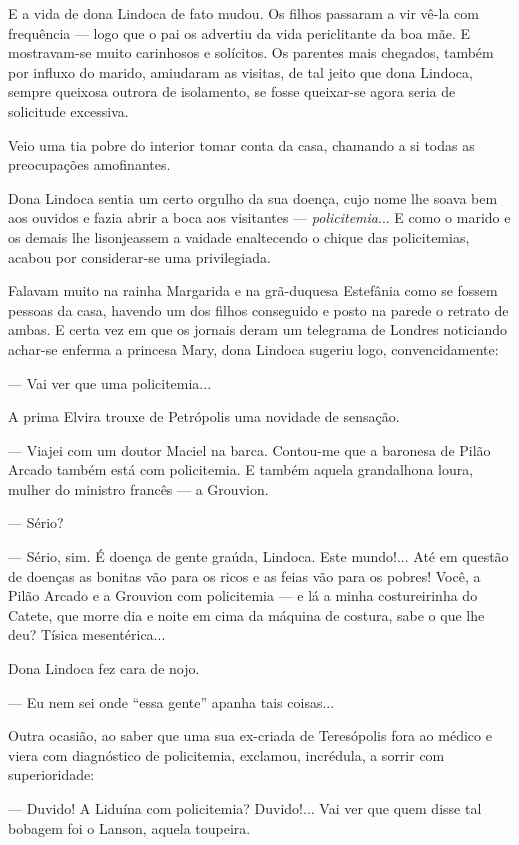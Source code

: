 E a vida de dona Lindoca de fato mudou. Os filhos passaram a vir vê-la
com frequência --- logo que o pai os advertiu da vida periclitante da
boa mãe. E mostravam-se muito carinhosos e solícitos. Os parentes mais
chegados, também por influxo do marido, amiudaram as visitas, de tal
jeito que dona Lindoca, sempre queixosa outrora de isolamento, se fosse
queixar-se agora seria de solicitude excessiva.

Veio uma tia pobre do interior tomar conta da casa, chamando a si todas
as preocupações amofinantes.

Dona Lindoca sentia um certo orgulho da sua doença, cujo nome lhe soava
bem aos ouvidos e fazia abrir a boca aos visitantes ---
\emph{policitemia}... E como o marido e os demais lhe lisonjeassem a
vaidade enaltecendo o chique das policitemias, acabou por considerar-se
uma privilegiada.

Falavam muito na rainha Margarida e na grã-duquesa Estefânia como se
fossem pessoas da casa, havendo um dos filhos conseguido e posto na
parede o retrato de ambas. E certa vez em que os jornais deram um
telegrama de Londres noticiando achar-se enferma a princesa Mary, dona
Lindoca sugeriu logo, convencidamente:

--- Vai ver que uma policitemia...

A prima Elvira trouxe de Petrópolis uma novidade de sensação.

--- Viajei com um doutor Maciel na barca. Contou-me que a baronesa de
Pilão Arcado também está com policitemia. E também aquela grandalhona
loura, mulher do ministro francês --- a Grouvion.

--- Sério?

--- Sério, sim. É doença de gente graúda, Lindoca. Este mundo!... Até em
questão de doenças as bonitas vão para os ricos e as feias vão para os
pobres! Você, a Pilão Arcado e a Grouvion com policitemia --- e lá a
minha costureirinha do Catete, que morre dia e noite em cima da máquina
de costura, sabe o que lhe deu? Tísica mesentérica...

Dona Lindoca fez cara de nojo.

--- Eu nem sei onde ``essa gente'' apanha tais coisas...

Outra ocasião, ao saber que uma sua ex-criada de Teresópolis fora ao
médico e viera com diagnóstico de policitemia, exclamou, incrédula, a
sorrir com superioridade:

--- Duvido! A Liduína com policitemia? Duvido!... Vai ver que quem disse
tal bobagem foi o Lanson, aquela toupeira.

